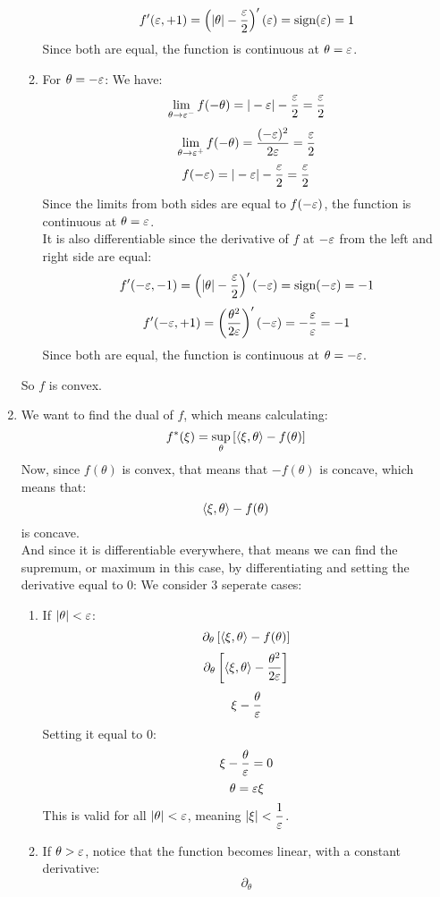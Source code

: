 \documentclass[12pt]{article}
\begin{document}
\begin{enumerate}[label = \letters]
\begin{enumerate}[label = \numbers]
        \[ f'(\varepsilon, +1) = \left( |\theta| - 
        \dfrac{\varepsilon}{2} \right)'(\varepsilon) = \text{sign}(\varepsilon) = 1 \]
        Since both are equal,
        the function is continuous
        at $\theta = \varepsilon$.
        \item For $\theta = -\varepsilon$:
        We have:
        \[ \lim_{\theta \to \varepsilon^-} f(-\theta)
        = |-\varepsilon| - \dfrac{\varepsilon}{2} = \dfrac{\varepsilon}{2} \]
        \[ \lim_{\theta \to \varepsilon^+} f(-\theta)
        = \dfrac{(-\varepsilon)^2}{2\varepsilon} = \dfrac{\varepsilon}{2} \]
        \[ f(-\varepsilon) = |-\varepsilon| - \dfrac{\varepsilon}{2} 
        = \dfrac{\varepsilon}{2} \]
        Since the limits from both sides are equal
        to $f(-\varepsilon)$, the function is continuous
        at $\theta = \varepsilon$. \\
        It is also differentiable since the
        derivative of $f$ at $-\varepsilon$ 
        from the left and right side are equal:
        \[ f'(-\varepsilon, -1) = \left( |\theta| - 
        \dfrac{\varepsilon}{2} \right)'(-\varepsilon) = \text{sign}(-\varepsilon) = -1 \]
        \[ f'(-\varepsilon, +1) = 
        \left( \dfrac{\theta^2}{2\varepsilon} \right)'(-\varepsilon)
        = -\dfrac{\varepsilon}{\varepsilon} = -1 \] 
        Since both are equal,
        the function is continuous
        at $\theta = -\varepsilon$.
    \end{enumerate}
    So $f$ is convex.
    \item 
    We want to find the dual of $f$,
    which means calculating:
    \[ f^*(\xi) = \sup_\theta 
    \left[  \left\langle \xi, \theta \right\rangle - f(\theta) \right] \]
    Now, since $f(\theta)$ is convex, that
    means that $-f(\theta)$ is concave,
    which means that:
    \[ \left\langle \xi, \theta \right\rangle - f(\theta) \]
    is concave. \\
    And since it is differentiable everywhere,
    that means we can find the supremum, or maximum
    in this case, by differentiating and setting the
    derivative equal to $0$:
    We consider $3$ seperate cases:
    \begin{enumerate}[label = \numbers]
        \item If $|\theta| < \varepsilon$:
        \[ \partial_\theta 
        \left[  \left\langle \xi, \theta \right\rangle - f(\theta) \right] \]
        \[ \partial_\theta \left[  \left\langle \xi, \theta \right\rangle 
        - \dfrac{\theta^2}{2\varepsilon} \right] \]
        \[ \xi - \dfrac{\theta}{\varepsilon} \]
        Setting it equal to $0$:
        \[ \xi - \dfrac{\theta}{\varepsilon} = 0 \]
        \[ \theta = \varepsilon \xi \]
        This is valid for all $|\theta| < \varepsilon$,
        meaning $|\xi| < \dfrac{1}{\varepsilon}$.
        \item If $\theta > \varepsilon$,
        notice that the function becomes linear,
        with a constant derivative:
        \[ \partial_\theta 
\]
\end{enumerate}
\end{enumerate}
\end{document}
